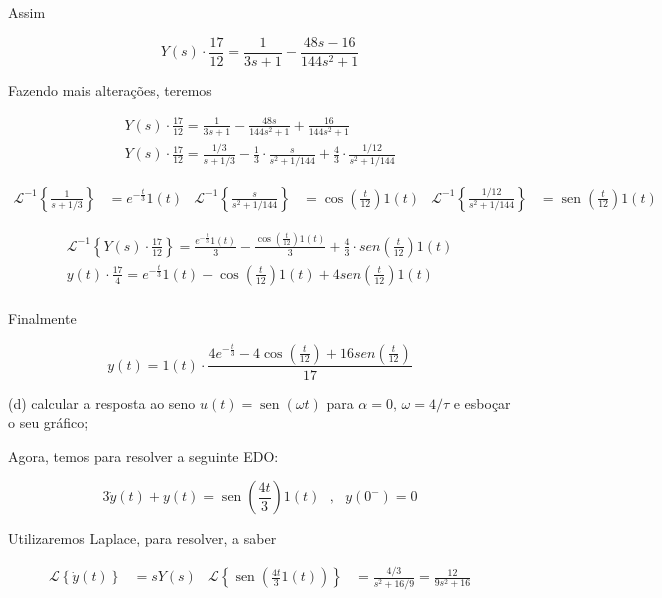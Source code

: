 \documentclass{article}
\DeclareMathOperator{\sen}{sen}
\begin{document}
Assim

\[Y(s) \cdot \frac{17}{12} = \frac{1}{3s + 1} - \frac{48s - 16}{144s^2 + 1}\]

Fazendo mais alterações, teremos

\begin{align*}
    Y(s) \cdot \frac{17}{12} = \frac{1}{3s + 1} - \frac{48s}{144s^2 + 1} + \frac{16}{144s^2 + 1}\\
    Y(s) \cdot \frac{17}{12} = \frac{1/3}{s + 1/3} - \frac{1}{3}\cdot\frac{s}{s^2 + 1/144} + \frac{4}{3}\cdot\frac{1/12}{s^2 + 1/144}
\end{align*}

\begin{align*}
    \mathcal{L}^{-1} \left\{\frac{1}{s + 1/3}\right\} &= e^{-\frac{t}{3}}1(t) & \mathcal{L}^{-1} \left\{\frac{s}{s^2 + 1/144}\right\} &= \cos\left(\frac{t}{12}\right)1(t) & \mathcal{L}^{-1} \left\{\frac{1/12}{s^2 + 1/144}\right\} &= \sen\left(\frac{t}{12}\right)1(t)
\end{align*}

\begin{align*}
    \mathcal{L}^{-1} \left\{Y(s) \cdot \frac{17}{12}\right\} = \frac{e^{-\frac{t}{3}}1(t)}{3} - \frac{\cos\left(\frac{t}{12}\right)1(t)}{3} + \frac{4}{3}\cdot sen\left(\frac{t}{12}\right)1(t)\\
    y(t) \cdot \frac{17}{4} = e^{-\frac{t}{3}}1(t) - \cos\left(\frac{t}{12}\right)1(t) + 4sen\left(\frac{t}{12}\right)1(t)\\
\end{align*}

Finalmente

\[y(t) = 1(t)\cdot\frac{4e^{-\frac{t}{3}} - 4\cos\left(\frac{t}{12}\right) + 16sen\left(\frac{t}{12}\right)}{17}\]

(d) calcular a resposta ao seno $u(t) = \sen(\omega t)$ para $\alpha = 0,\, \omega = 4/\tau$ e esboçar o seu gráfico;

Agora, temos para resolver a seguinte EDO:

\[ 3\dot{y}(t) + y(t) = \sen\left(\frac{4t}{3}\right)1(t) \,\,\,\,,\,\,\,\, y(0^-) = 0\]

Utilizaremos Laplace, para resolver, a saber

\begin{align*}
    \mathcal{L}\left\{\dot{y}(t)\right\} &= sY(s) & \mathcal{L}\left\{\sen \left(\frac{4t}{3}1(t)\right) \right\} &= \frac{4/3}{s^2 + 16/9} = \frac{12}{9s^2 + 16}
\end{align*}
\end{document}
